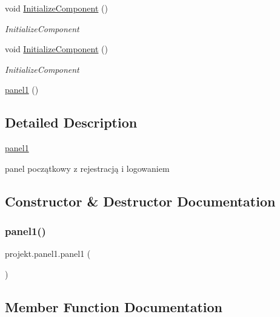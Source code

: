 \begin{DoxyCompactItemize}
void \mbox{\hyperlink{classprojekt_1_1panel1_ac484186ff491641f3655f8ae2045bf54}{Initialize\+Component}} ()
\begin{DoxyCompactList}\small\item\em Initialize\+Component \end{DoxyCompactList}\item 
void \mbox{\hyperlink{classprojekt_1_1panel1_ac484186ff491641f3655f8ae2045bf54}{Initialize\+Component}} ()
\begin{DoxyCompactList}\small\item\em Initialize\+Component \end{DoxyCompactList}\item 
\mbox{\hyperlink{classprojekt_1_1panel1_a7440a39d8704e252b8d181a930174ef3}{panel1}} ()
\end{DoxyCompactItemize}


\subsection{Detailed Description}
\mbox{\hyperlink{classprojekt_1_1panel1}{panel1}} 

panel początkowy z rejestracją i logowaniem 

\subsection{Constructor \& Destructor Documentation}
\mbox{\label{classprojekt_1_1panel1_a7440a39d8704e252b8d181a930174ef3}} 
\subsubsection{\texorpdfstring{panel1()}{panel1()}}
{\footnotesize\ttfamily projekt.\+panel1.\+panel1 (\begin{DoxyParamCaption}{ }\end{DoxyParamCaption})\hspace{0.3cm}{\ttfamily [inline]}}



\subsection{Member Function Documentation}
\mbox{\label{classprojekt_1_1panel1_ac484186ff491641f3655f8ae2045bf54}} 
